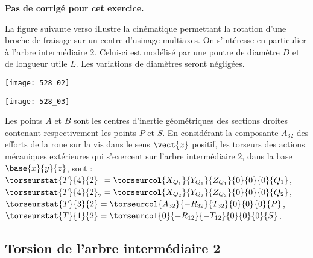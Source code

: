 \normaltrue
\correctionfalse


\setcounter{numques}{0}

\ifcorrection
\else
\textbf{Pas de corrigé pour cet exercice.}
\fi

\ifprof
\else

La figure suivante verso illustre la cinématique permettant la rotation d'une broche de fraisage sur un centre d'usinage multiaxes.
On s'intéresse en particulier à l'arbre intermédiaire 2. Celui-ci est modélisé  par une poutre de diamètre $D$ et de longueur utile $L$. Les variations de diamètres seront négligées.

\begin{center}
\texttt{[image: 528\_02]}
\end{center}


\begin{center}
\texttt{[image: 528\_03]}
\end{center}


Les points $A$ et $B$ sont les centres d’inertie géométriques des sections droites contenant
respectivement les points $P$ et $S$.
En considérant la composante $A_{32}$ des efforts de la roue sur la vis dans le sens $\vect{x}$ positif, les
torseurs des actions mécaniques extérieures qui s’exercent sur l’arbre intermédiaire 2, dans la base
$\base{x}{y}{z}$, sont :
$\torseurstat{T}{4}{2}_1 = \torseurcol{X_{Q_1}}{Y_{Q_1}}{Z_{Q_1}}{0}{0}{0}{Q_1}$, 
$\torseurstat{T}{4}{2}_2 = \torseurcol{X_{Q_2}}{Y_{Q_2}}{Z_{Q_2}}{0}{0}{0}{Q_2}$, 
$\torseurstat{T}{3}{2} = \torseurcol{A_{32}}{-R_{32}}{T_{32}}{0}{0}{0}{P}$, 
$\torseurstat{T}{1}{2} = \torseurcol{0}{-R_{12}}{-T_{12}}{0}{0}{0}{S}$.

\fi




\subsection*{Torsion de l’arbre intermédiaire 2}

